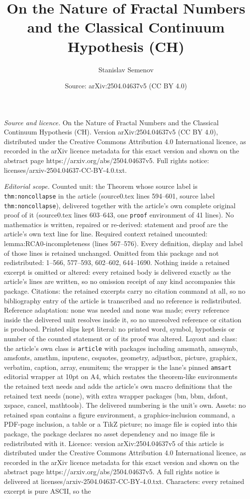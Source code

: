 \documentclass[10pt,a4paper]{amsart}
\title[On the Nature of Fractal Numbers and the Classical Continuum]{On the Nature of Fractal Numbers and the Classical Continuum Hypothesis (CH)}
\author{Stanislav Semenov}
\date{Source: arXiv:2504.04637v5 (CC BY 4.0)}
\begin{document}
\maketitle

\noindent\emph{Source and licence.} On the Nature of Fractal Numbers and the Classical Continuum Hypothesis (CH). Version arXiv:2504.04637v5 (CC BY 4.0), distributed under the Creative Commons Attribution 4.0 International licence, as recorded in the arXiv licence metadata for this exact version and shown on the abstract page https://arxiv.org/abs/2504.04637v5. Full rights notice: licenses/arxiv-2504.04637-CC-BY-4.0.txt.\par\smallskip

\noindent\textit{Editorial scope.} Counted unit: the Theorem whose source label is \texttt{thm:noncollapse} in the article (source0.tex lines 594--601, source label \texttt{thm:noncollapse}), delivered together with the article's own complete original proof of it (source0.tex lines 603--643, one \texttt{proof} environment of 41 lines). No mathematics is written, repaired or re-derived: statement and proof are the article's own text line for line. Required context retained uncounted: lemma:RCA0-incompleteness (lines 567--576). Every definition, display and label of those lines is retained unchanged. Omitted from this package and not redistributed: 1--566, 577--593, 602--602, 644--1690. Nothing inside a retained excerpt is omitted or altered: every retained body is delivered exactly as the article's lines are written, so no omission receipt of any kind accompanies this package. Citations: the retained excerpts carry no citation command at all, so no bibliography entry of the article is transcribed and no reference is redistributed. Reference adaptation: none was needed and none was made; every reference inside the delivered unit resolves inside it, so no unresolved reference or citation is produced. Printed slips kept literal: no printed word, symbol, hypothesis or number of the counted statement or of its proof was altered. Layout and class: the article's own class is \texttt{article} with packages including amsmath, amssymb, amsfonts, amsthm, inputenc, csquotes, geometry, adjustbox, picture, graphicx, verbatim, caption, array, enumitem; the wrapper is the lane's pinned \texttt{amsart} editorial wrapper at 10pt on A4, which restates the theorem-like environments the retained text needs and adds the article's own macro definitions that the retained text needs (none), with extra wrapper packages (bm, bbm, dsfont, xspace, cancel, mathtools). The delivered numbering is the unit's own. Assets: no retained span contains a figure environment, a graphics-inclusion command, a PDF-page inclusion, a table or a TikZ picture; no image file is copied into this package, the package declares no asset dependency and no image file is redistributed with it. Licence: version arXiv:2504.04637v5 of this article is distributed under the Creative Commons Attribution 4.0 International licence, as recorded in the arXiv licence metadata for this exact version and shown on the abstract page https://arxiv.org/abs/2504.04637v5. A full rights notice is delivered at licenses/arxiv-2504.04637-CC-BY-4.0.txt. Characters: every retained excerpt is pure ASCII, so the 
\end{document}
